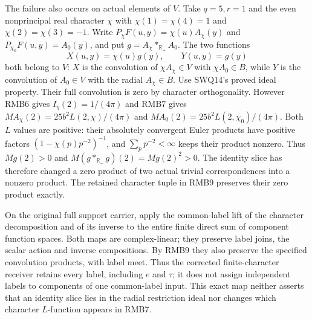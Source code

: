 The failure also occurs on actual elements of $V$.
Take $q=5,r=1$ and the even nonprincipal real character
$\chi$ with $\chi(1)=\chi(4)=1$ and
$\chi(2)=\chi(3)=-1$. Write
$P_\chi F(u,y)=\chi(u)A_\chi(y)$ and
$P_{\chi_0}F(u,y)=A_0(y)$, and put
$g=A_\chi*_{\mathbb R_+}A_0$. The two functions
\begin{equation}\tag{RMB10}
 X(u,y)=\chi(u)g(y),\qquad Y(u,y)=g(y)
\end{equation}
both belong to $V$: $X$ is the convolution of
$\chi A_\chi\in V$ with $\chi A_0\in B$, while $Y$
is the convolution of $A_0\in V$ with the radial
$A_\chi\in B$. Use SWQ14's proved ideal property.
Their full convolution is zero by character orthogonality.
However RMB6 gives $I_\eta(2)=1/(4\pi)$ and RMB7 gives
$M A_\chi(2)=25b^2L(2,\chi)/(4\pi)$ and
$M A_0(2)=25b^2L(2,\chi_0)/(4\pi)$.
Both $L$ values are positive: their absolutely convergent
Euler products have positive factors
$(1-\chi(p)p^{-2})^{-1}$, and
$\sum_p p^{-2}<\infty$ keeps their product nonzero.
Thus $Mg(2)>0$ and $M(g*_{\mathbb R_+}g)(2)=Mg(2)^2>0$.
The identity slice has therefore changed a zero product of
two actual trivial correspondences into a nonzero product.
The retained character tuple in RMB9 preserves their zero
product exactly.

On the original full support carrier, apply the common-label
lift of the character decomposition and of its inverse to
the entire finite direct sum of component function spaces.
Both maps are complex-linear; they preserve label joins,
the scalar action and inverse compositions. By RMB9 they
also preserve the specified convolution products, with label
meet. Thus the corrected finite-character receiver retains
every label, including $e$ and $\tau$; it does not assign
independent labels to components of one common-label input.
This exact map neither asserts that an identity slice lies
in the radial restriction ideal nor changes which character
$L$-function appears in RMB7.

